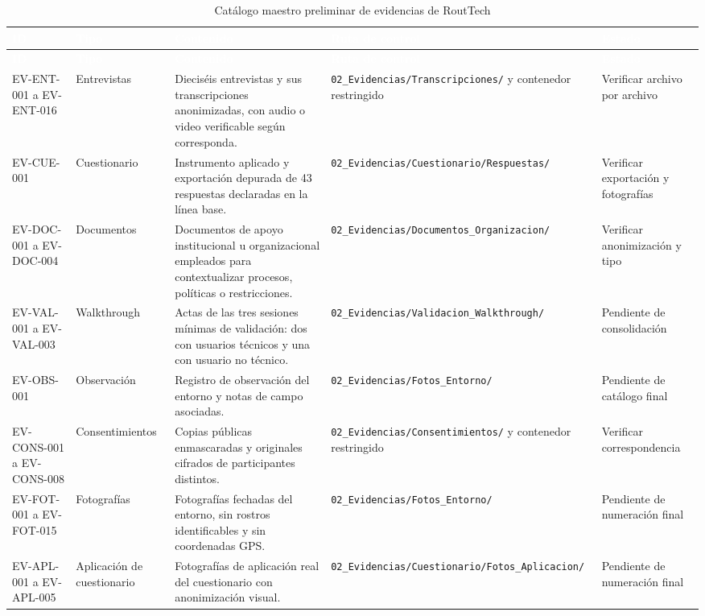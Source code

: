 \documentclass[12pt,a4paper]{article}
\begin{document}
\begin{longtable}{L{2.15cm} L{2.40cm} L{3.25cm} L{3.20cm} L{2.20cm}}
\caption{Catálogo maestro preliminar de evidencias de RoutTech}\label{tab:catalogo-maestro-evidencias}\\
\textcolor{white}{\textbf{ID}} &
\textcolor{white}{\textbf{Tipo}} &
\textcolor{white}{\textbf{Contenido}} &
\textcolor{white}{\textbf{Ruta de control}} &
\textcolor{white}{\textbf{Estado}}\\
\endfirsthead
{}
\textcolor{white}{\textbf{ID}} &
\textcolor{white}{\textbf{Tipo}} &
\textcolor{white}{\textbf{Contenido}} &
\textcolor{white}{\textbf{Ruta de control}} &
\textcolor{white}{\textbf{Estado}}\\
\endhead
EV-ENT-001 a EV-ENT-016 & Entrevistas & Dieciséis entrevistas y sus transcripciones anonimizadas, con audio o video verificable según corresponda. & \nolinkurl{02_Evidencias/Transcripciones/} y contenedor restringido & Verificar archivo por archivo\\
EV-CUE-001 & Cuestionario & Instrumento aplicado y exportación depurada de 43 respuestas declaradas en la línea base. & \nolinkurl{02_Evidencias/Cuestionario/Respuestas/} & Verificar exportación y fotografías\\
EV-DOC-001 a EV-DOC-004 & Documentos & Documentos de apoyo institucional u organizacional empleados para contextualizar procesos, políticas o restricciones. & \nolinkurl{02_Evidencias/Documentos_Organizacion/} & Verificar anonimización y tipo\\
EV-VAL-001 a EV-VAL-003 & Walkthrough & Actas de las tres sesiones mínimas de validación: dos con usuarios técnicos y una con usuario no técnico. & \nolinkurl{02_Evidencias/Validacion_Walkthrough/} & Pendiente de consolidación\\
EV-OBS-001 & Observación & Registro de observación del entorno y notas de campo asociadas. & \nolinkurl{02_Evidencias/Fotos_Entorno/} & Pendiente de catálogo final\\
EV-CONS-001 a EV-CONS-008 & Consentimientos & Copias públicas enmascaradas y originales cifrados de participantes distintos. & \nolinkurl{02_Evidencias/Consentimientos/} y contenedor restringido & Verificar correspondencia\\
EV-FOT-001 a EV-FOT-015 & Fotografías & Fotografías fechadas del entorno, sin rostros identificables y sin coordenadas GPS. & \nolinkurl{02_Evidencias/Fotos_Entorno/} & Pendiente de numeración final\\
EV-APL-001 a EV-APL-005 & Aplicación de cuestionario & Fotografías de aplicación real del cuestionario con anonimización visual. & \nolinkurl{02_Evidencias/Cuestionario/Fotos_Aplicacion/} & Pendiente de numeración final\\
\end{longtable}
\end{document}
